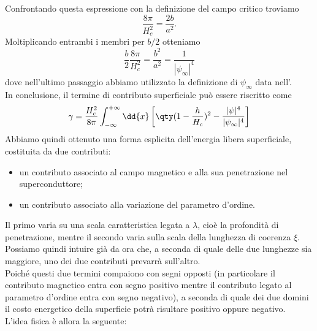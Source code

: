 Confrontando questa espressione con la definizione del campo critico troviamo
\begin{equation*}
   \frac{8\pi}{H_c^2}
   =
   \frac{2b}{a^2}.
\end{equation*}
Moltiplicando entrambi i membri per $b/2$ otteniamo
\begin{equation*}
   \frac{b}{2}\frac{8\pi}{H_c^2}
   =
   \frac{b^2}{a^2}
   =
   \frac{1}{|\psi_\infty|^4}
\end{equation*}
dove nell'ultimo passaggio abbiamo utilizzato la definizione di $\psi_\infty$ data nell'.\\
In conclusione, il termine di contributo superficiale può essere riscritto come
\begin{equation}
   \gamma
   = \frac{H_c^2}{8\pi} \int_{-\infty}^{+\infty} \dd{x}
   \left[ \qty( 1 - \frac{h}{H_c} )^2 - \frac{|\psi|^4}{|\psi_\infty|^4} \right]
   \label{eq:contributo_superficiale_finale}
\end{equation}
Abbiamo quindi ottenuto una forma esplicita dell'energia libera superficiale, costituita da due contributi:
\begin{itemize}[leftmargin=0.5cm]
   \item un contributo associato al campo magnetico e alla sua penetrazione nel superconduttore;
   \item un contributo associato alla variazione del parametro d'ordine.
\end{itemize}
Il primo varia su una scala caratteristica legata a $\lambda$, cioè la profondità di penetrazione, mentre il secondo varia sulla scala della lunghezza di coerenza $\xi$.\\
Possiamo quindi intuire già da ora che, a seconda di quale delle due lunghezze sia maggiore, uno dei due contributi prevarrà sull'altro.\\
Poiché questi due termini compaiono con segni opposti (in particolare il contributo magnetico entra con segno positivo mentre il contributo legato al parametro d'ordine entra con segno negativo), a seconda di quale dei due domini il costo energetico della superficie potrà risultare positivo oppure negativo.\\
L'idea fisica è allora la seguente:
